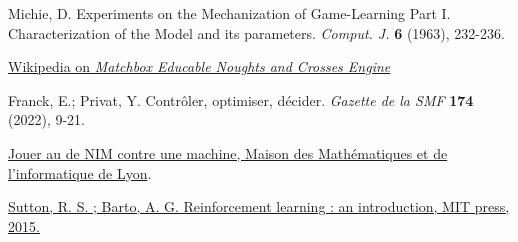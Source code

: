 \documentclass[a4paper,12pt]{article}
\begin{document}
\begin{thebibliography}{100} \label{ruxe9fuxe9rences}

Michie, D. Experiments on the Mechanization of Game-Learning Part I.
  Characterization of the Model and its parameters. 
  \emph{Comput. J.} \textbf{6} (1963), 232-236.

\href{https://en.wikipedia.org/wiki/Matchbox_Educable_Noughts_and_Crosses_Engine}{Wikipedia on \emph{Matchbox Educable Noughts and Crosses Engine}}
  
Franck, E.; Privat, Y. Contrôler, optimiser, décider. \emph{Gazette de la SMF} \textbf{174} (2022), 9-21.
  
\href{https://mmi-lyon.fr/jouer-au-jeu-de-nim-contre-une-machine}{Jouer au de NIM contre une machine, Maison des Mathématiques et de l'informatique de Lyon}.
  
\href{https://web.stanford.edu/class/psych209/Readings/SuttonBartoIPRLBook2ndEd.pdf}{Sutton,  R. S. ; Barto, A. G. Reinforcement learning : an introduction, MIT press, 2015.}
\end{thebibliography}
\end{document}
